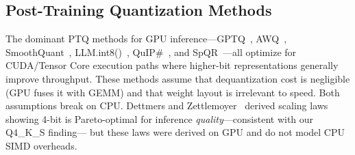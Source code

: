 \documentclass[conference]{IEEEtran}
\begin{document}
\begin{table}[t]
\centering
\caption{Comparison with the closest related empirical work.
\checkmark = measured and explained; $\circ$ = observed but unexplained; -- = not addressed.}
\label{tab:rw_comparison}
\end{table}

\subsection{Post-Training Quantization Methods}

The dominant PTQ methods for GPU inference---GPTQ~\cite{gptq}, AWQ~\cite{awq},
SmoothQuant~\cite{smoothquant}, LLM.int8()~\cite{dettmers_int8}, QuIP\#~\cite{quip},
and SpQR~\cite{spqr}---all optimize for CUDA/Tensor Core execution paths where
higher-bit representations generally improve throughput. These methods assume
that dequantization cost is negligible (GPU fuses it with GEMM) and that
weight layout is irrelevant to speed. Both assumptions break on CPU.
Dettmers and Zettlemoyer~\cite{dettmers_kbit} derived scaling laws showing 4-bit
is Pareto-optimal for inference \emph{quality}---consistent with our Q4\_K\_S finding---
but these laws were derived on GPU and do not model CPU SIMD overheads.
\end{document}
